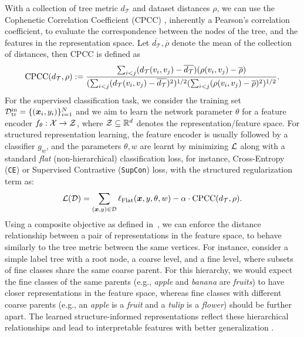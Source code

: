 With a collection of tree metric $d_\mathcal{T}$ and dataset distances $\rho$, we can use the Cophenetic Correlation Coefficient (CPCC) \citep{cpcc}, inherently a Pearson's correlation coefficient, to evaluate the correspondence between the nodes of the tree, and the features in the representation space. Let $\overline{d_\mathcal{T}}, \overline{\rho}$ denote the mean of the collection of distances, then CPCC is defined as
\begin{equation}
\label{eq:CPCC}
    \text{CPCC}(d_\mathcal{T}, \rho) := \frac{\sum_{i<j}(d_\mathcal{T}(v_i,v_j) - \overline{d_\mathcal{T}})(\rho(v_i,v_j) - \overline{\rho})}{(\sum_{i<j}(d_\mathcal{T}(v_i,v_j) - \overline{d_\mathcal{T}})^2)^{1/2} (\sum_{i<j}(\rho(v_i,v_j) - \overline{\rho})^2)^{1/2}}. 
\end{equation}
For the supervised classification task, we consider the training set  $\mathcal{D}_{\text{tr}}^{\text{in}} = \{({\bm{x}}_i, y_i)\}_{i=1}^N$ and we aim to learn the network parameter $\theta$ for a feature encoder $f_\theta : \mathcal{X} \to {\mathcal{Z}}$, where ${\mathcal{Z}} \subseteq \mathbb{R}^{d}$ denotes the representation/feature space. For structured representation learning, the feature encoder is usually followed by a classifier $g_{w}$, and the parameters $\theta, w$ are learnt by minimizing ${\mathcal{L}}$ along with a standard \emph{flat} (non-hierarchical) classification loss, for instance, Cross-Entropy (\texttt{CE}) or Supervised Contrastive (\texttt{SupCon}) \citep{2020supcon} loss, with the structured regularization term as:
\begin{equation}
    \label{eq:objective_regularizer}
    \mathcal{L}({\mathcal{D}}) = \sum_{({\bm{x}}, y)\in {\mathcal{D}}} \ell_\text{Flat}({\bm{x}},y,\theta, w) - \alpha\cdot\text{CPCC}(d_{\mathcal{T}}, \rho).        
\end{equation}
Using a composite objective as defined in~, we can enforce the distance relationship between a pair of representations in the feature space, to behave similarly to the tree metric between the same vertices. For instance, consider a simple label tree with a root node, a coarse level, and a fine level, where subsets of fine classes share the same coarse parent. For this hierarchy, we would expect the fine classes of the same parents (e.g., \emph{apple} and \emph{banana} are \emph{fruits}) to have closer representations in the feature space, whereas fine classes with different coarse parents (e.g., an \emph{apple} is a \emph{fruit} and a \emph{tulip} is a \emph{flower}) should be further apart. The learned structure-informed representations reflect these hierarchical relationships and lead to interpretable features with better generalization \citep{zeng2022learning}.

